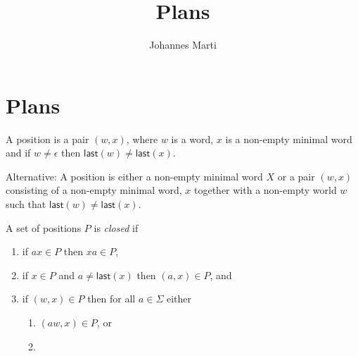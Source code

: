 \documentclass[a4paper]{article}
\title{Plans}
\author{Johannes Marti}
\newcommand{\last}[1]{\mathsf{last}({#1})}
\begin{document}
\maketitle

\section{Plans}

A position is a pair $(w,x)$, where $w$ is a word, $x$ is a non-empty
minimal word and if $w \neq \epsilon$ then $\last{w} \neq \last{x}$.

Alternative:
A position is either a non-empty minimal word $X$ or a pair $(w,x)$ consisting
of a non-empty minimal word, $x$ together with a non-empty world $w$
such that $\last{w} \neq \last{x}$.

A set of positions $P$ is \emph{closed} if
\begin{enumerate}
 \item if $a x \in P$ then $x a \in P$,
 \item if $x \in P$ and $a \neq \last{x}$ then $(a,x) \in P$, and
 \item if $(w, x) \in P$ then for all $a \in \Sigma$ either
    \begin{enumerate}
     \item $(aw, x) \in P$, or
     \item 
    \end{enumerate}

\end{enumerate}
\end{document}
